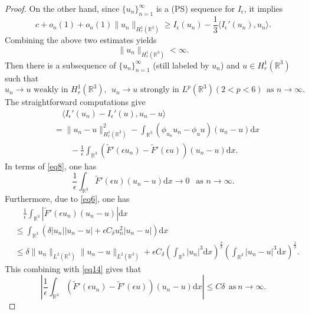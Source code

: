 \documentclass[12pt]{amsart}
\numberwithin{equation}{section}
\theoremstyle{definition}
\begin{document}
\begin{proof}
On the other hand, since $\{u_n\}_{n=1}^\infty$ is a (PS) sequence for $I_\epsilon$, it implies
$$c+o_{n}(1)+o_{n}(1)\|u_n\|_{H^1_r(\mathbb R^3)}\geq I_{\epsilon}(u_n)-\frac{1}{3}\langle I_{\epsilon}'(u_n),u_n\rangle.$$
Combining the above two estimates yields
\begin{equation*}
\|u_n\|_{H^1_r(\mathbb R^3)}<\infty.
\end{equation*}
Then there is a subsequence of $\{u_n\}_{n=1}^\infty$ (still labeled by $u_n$) and $u\in H^{1}_{r}(\mathbb{R}^{3})$ such that
\begin{equation}\label{eq12}
	u_n\rightarrow u \text{ weakly in }H^1_r(\mathbb R^3),\ \ u_n\rightarrow u\text{ strongly in }L^p(\mathbb R^3)(2<p<6) \ \ \text{as } n\to\infty.
\end{equation}
The straightforward computations give
\begin{equation}\label{eq13}
	\begin{split}
	&\quad\langle I_{\epsilon}'(u_n)-I_{\epsilon}'(u),u_n-u \rangle\\
	&=\|u_n-u\|^{2}_{H^1_r(\mathbb R^3)}-\int_{\mathbb R^3}(\phi_{u_n}u_n-\phi_uu)(u_n-u)\text{d}x\\
	&\quad\quad-\frac{1}{\epsilon}\int_{\mathbb R^3}(\tilde F'(\epsilon u_n)-\tilde F'(\epsilon u))(u_n-u)\text{d}x.
\end{split}\end{equation}
In terms of \eqref{eq8}, one has
\begin{equation}\label{eq14}
	\frac{1}{\epsilon}\int_{\mathbb R^3}\tilde F'(\epsilon u)(u_n-u)\text{d}x\rightarrow0 \ \ \text{ as }n\rightarrow \infty.
\end{equation}
Furthermore, due to \eqref{eq6}, one has
\begin{equation*}
	\begin{split}
	&\quad\frac{1}{\epsilon}\int_{\mathbb R^3}\left|\tilde F'(\epsilon u_n)(u_n-u)\right|\text{d}x\\
&	\leq\int_{\mathbb R^3}\left(\delta |u_n||u_n-u|+ \epsilon C_\delta u_n^2|u_n-u|\right)\text{d}x\\
&\leq \delta\|u_n\|_{L^2(\mathbb R^3)}\|u_n-u\|_{L^2(\mathbb R^3)}+\epsilon C_\delta\left(\int_{\mathbb R^3}|u_n|^3\text{d}x\right)^{\frac{2}{3}}\left(\int_{\mathbb R^3}|u_n-u|^3\text{d}x\right)^{\frac{1}{3}}.
\end{split}\end{equation*}
This combining with \eqref{eq14} gives that
\begin{equation}\label{eq15}
	\left|\frac{1}{\epsilon}\int_{\mathbb R^3}(\tilde F'(\epsilon u_n)-\tilde F'(\epsilon u))(u_n-u)\text{d}x\right|\leq C\delta\ \ \text{as}~n\rightarrow\infty.

\end{equation}
\end{proof}
\end{document}
